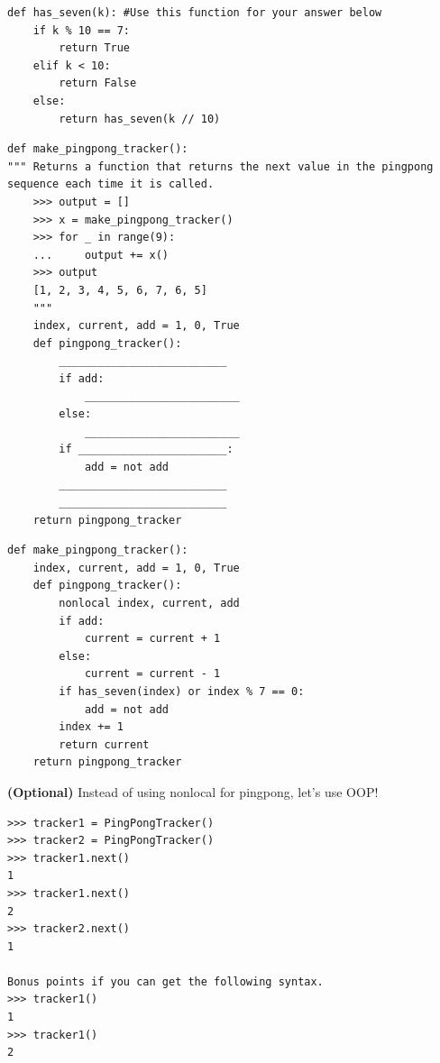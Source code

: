 \documentclass{exam}
\begin{document}
\begin{questions}
\begin{blocksection}
\begin{lstlisting}
def has_seven(k): #Use this function for your answer below
    if k % 10 == 7:
        return True
    elif k < 10:
        return False
    else:
        return has_seven(k // 10)
\end{lstlisting}
\end{blocksection}

\begin{blocksection}
\begin{lstlisting}
def make_pingpong_tracker():
""" Returns a function that returns the next value in the pingpong sequence each time it is called. 
    >>> output = []
    >>> x = make_pingpong_tracker()
    >>> for _ in range(9):
    ...     output += x()
    >>> output
    [1, 2, 3, 4, 5, 6, 7, 6, 5]
    """
    index, current, add = 1, 0, True
    def pingpong_tracker():
        __________________________
        if add:
            ________________________
        else:
            ________________________
        if _______________________:
            add = not add
        __________________________
        __________________________  
    return pingpong_tracker

\end{lstlisting}

\begin{solution}
\begin{lstlisting}
def make_pingpong_tracker():
    index, current, add = 1, 0, True
    def pingpong_tracker():
        nonlocal index, current, add
        if add:
            current = current + 1
        else:
            current = current - 1
        if has_seven(index) or index % 7 == 0:
            add = not add
        index += 1
        return current
    return pingpong_tracker
\end{lstlisting}
\end{solution}

\end{blocksection}

\begin{blocksection}
\question \textbf{(Optional)} Instead of using nonlocal for pingpong, let's use OOP!

\begin{lstlisting}
>>> tracker1 = PingPongTracker()
>>> tracker2 = PingPongTracker()
>>> tracker1.next()
1
>>> tracker1.next()
2
>>> tracker2.next()
1

Bonus points if you can get the following syntax.
>>> tracker1()
1
>>> tracker1()
2


\end{lstlisting}
\end{blocksection}
\end{questions}
\end{document}
